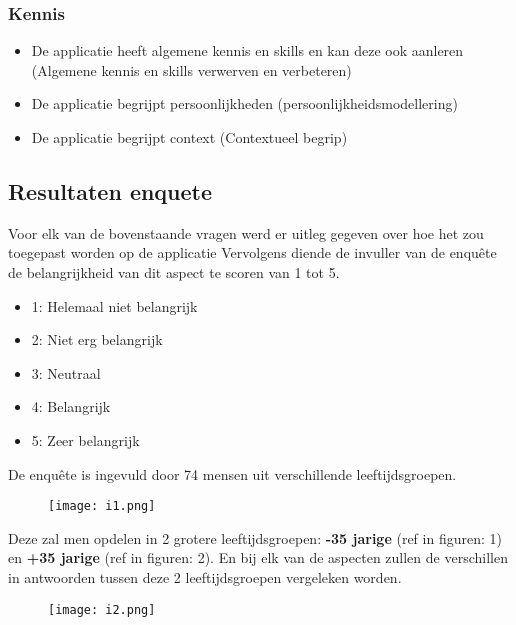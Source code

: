 \subsubsection{Kennis}

\begin{itemize}
    \item De applicatie heeft algemene kennis en skills en kan deze ook aanleren (Algemene kennis en skills verwerven en verbeteren)
    \item De applicatie begrijpt persoonlijkheden (persoonlijkheidsmodellering)
    \item De applicatie begrijpt context (Contextueel begrip)
\end{itemize}

\subsection{Resultaten enquete}

Voor elk van de bovenstaande vragen werd er uitleg gegeven over hoe het zou toegepast worden op de applicatie Vervolgens diende de invuller van de enquête de belangrijkheid van dit aspect te scoren van 1 tot 5.

\begin{itemize}
    \item 1: Helemaal niet belangrijk
    \item 2: Niet erg belangrijk
    \item 3: Neutraal
    \item 4: Belangrijk
    \item 5: Zeer belangrijk
\end{itemize}

De enquête is ingevuld door 74 mensen uit verschillende leeftijdsgroepen.

\begin{figure}[htbp]
    \centering
    \texttt{[image: i1.png]}
    \label{fig:leeftijdsgroepen_resultaat}
\end{figure}

Deze zal men opdelen in 2 grotere leeftijdsgroepen: \textbf{-35 jarige} (ref in figuren: 1) en \textbf{+35 jarige} (ref in figuren: 2). En bij elk van de aspecten zullen de verschillen in antwoorden tussen deze 2 leeftijdsgroepen vergeleken worden.

\begin{figure}[htbp]
    \centering
    \texttt{[image: i2.png]}
    \label{fig:ai_kennis_resultaat}
\end{figure}

